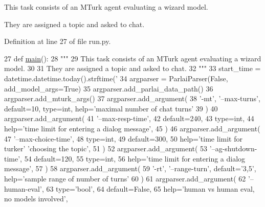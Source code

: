\begin{DoxyVerb}This task consists of an MTurk agent evaluating a wizard model.

They are assigned a topic and asked to chat.
\end{DoxyVerb}
 

Definition at line 27 of file run.\+py.


\begin{DoxyCode}
27 \textcolor{keyword}{def }\hyperlink{namespaceprojects_1_1wizard__of__wikipedia_1_1mturk__evaluation__task_1_1run_ad3ab2c71f8083c3112815c0b363d316b}{main}():
28     \textcolor{stringliteral}{"""}
29 \textcolor{stringliteral}{    This task consists of an MTurk agent evaluating a wizard model.}
30 \textcolor{stringliteral}{}
31 \textcolor{stringliteral}{    They are assigned a topic and asked to chat.}
32 \textcolor{stringliteral}{    """}
33     start\_time = datetime.datetime.today().strftime(\textcolor{stringliteral}{'%
34     argparser = ParlaiParser(\textcolor{keyword}{False}, add\_model\_args=\textcolor{keyword}{True})
35     argparser.add\_parlai\_data\_path()
36     argparser.add\_mturk\_args()
37     argparser.add\_argument(
38         \textcolor{stringliteral}{'-mt'}, \textcolor{stringliteral}{'--max-turns'}, default=10, type=int, help=\textcolor{stringliteral}{'maximal number of chat turns'}
39     )
40     argparser.add\_argument(
41         \textcolor{stringliteral}{'--max-resp-time'},
42         default=240,
43         type=int,
44         help=\textcolor{stringliteral}{'time limit for entering a dialog message'},
45     )
46     argparser.add\_argument(
47         \textcolor{stringliteral}{'--max-choice-time'},
48         type=int,
49         default=300,
50         help=\textcolor{stringliteral}{'time limit for turker'} \textcolor{stringliteral}{'choosing the topic'},
51     )
52     argparser.add\_argument(
53         \textcolor{stringliteral}{'--ag-shutdown-time'},
54         default=120,
55         type=int,
56         help=\textcolor{stringliteral}{'time limit for entering a dialog message'},
57     )
58     argparser.add\_argument(
59         \textcolor{stringliteral}{'-rt'}, \textcolor{stringliteral}{'--range-turn'}, default=\textcolor{stringliteral}{'3,5'}, help=\textcolor{stringliteral}{'sample range of number of turns'}
60     )
61     argparser.add\_argument(
62         \textcolor{stringliteral}{'--human-eval'},
63         type=\textcolor{stringliteral}{'bool'},
64         default=\textcolor{keyword}{False},
65         help=\textcolor{stringliteral}{'human vs human eval, no models involved'},
}
\end{DoxyCode}
